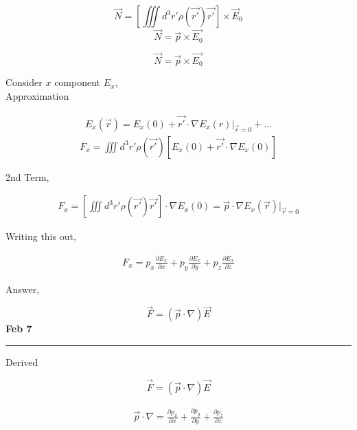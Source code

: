 \documentclass[svgnames]{article}   	%
\begin{document}
\[
  \vec{N} = \left[\iiint d^3r' \rho(\vec{r'}) \vec{r'} \right] \times \vec{E}_0
\]
\[
  \vec{N} = \vec{p} \times \vec{E_0}
\]

\begin{tcolorbox}[colback = blue!5!white, colframe = blue!50!black, title
  = Torque Equation]
  
  \[
    \vec{N} = \vec{p} \times \vec{E_0}
  \]
  
  

\end{tcolorbox}



Consider $x$ component $E_x$,\\ 

Approximation 

\begin{align*}
  E_x(\vec{r}) = E_x(0) + \vec{r'} \cdot \nabla E_x(r)\Big|_{\vec{r} = 0} + \dots
\end{align*}
\begin{align*}
  F_x = \iiint d^3r' \rho(\vec{r'}) [E_x(0) + \vec{r'} \cdot \nabla E_x(0)]
\end{align*}

2nd Term, 

\begin{align*}
  F_x = \left[\iiint d^3r' \rho(\vec{r'}) \vec{r'} \right] \cdot \nabla E_x(0)
  = \vec{p} \cdot \nabla E_x (\vec{r}) \Big|_{\vec{r}=0}
\end{align*}

Writing this out, 

\begin{align*}
  F_x = p_x \frac{\partial E_x}{\partial x} + p_y \frac{\partial E_x}{\partial
  y} + p_z \frac{\partial E_x}{\partial z} 
\end{align*}

Answer, 

\[
  \vec{F} = (\vec{p} \cdot \nabla)\vec{E}
\]
\newpage
\noindent \textbf{Feb 7} \hrule
\vspace{10px}

\noindent Derived 
\begin{tcolorbox}
  \[
  \vec{F} = (\vec{p} \cdot \nabla) \vec{E}
\]
\end{tcolorbox}

\begin{align*}
  \vec{p} \cdot \nabla = \frac{\partial p_x}{\partial x} + \frac{\partial
  p_y}{\partial y}  + \frac{\partial p_z}{\partial z}  
\end{align*}
\end{document}
